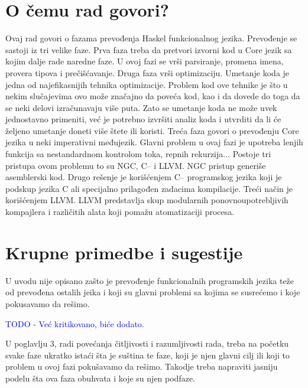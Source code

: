 \documentclass[a4paper]{report}
\newcommand{\odgovor}[1]{\textcolor{blue}{#1}}
\begin{document}
\section{O čemu rad govori?}
Ovaj rad govori o fazama prevođenja Haskel funkcionalnog jezika. Prevođenje se sastoji iz tri velike faze.
Prva faza treba da pretvori izvorni kod u Core jezik sa kojim dalje rade naredne faze. U ovoj fazi se vrši parsiranje, promena imena, provera tipova i prečišćavanje.
Druga faza vrši optimizaciju. Umetanje koda je jedna od najefikasnijih tehnika optimizacije. Problem kod ove tehnike je što u nekim slučajevima ovo može značajno da poveća kod, kao i da dovede do toga da se neki delovi izračunavaju više puta. Zato se umetanje koda ne može uvek jednostavno primeniti, već je potrebno izvršiti analiz koda i utvrditi da li će željeno umetanje doneti više štete ili koristi.
Treća faza govori o prevođenju Core jezika u neki imperativni međujezik. Glavni problem u ovaj fazi je upotreba lenjih funkcija sa nestandardnom kontrolom toka, repnih rekurzija... Postoje tri pristupa ovom problemu to su NGC, C-- i LLVM. NGC pristup generiše asemblerski kod. Drugo rešenje je korišćenjem C-- programskog jezika koji je podskup jezika C ali specijalno prilagođen zadacima kompilacije. Treći način je korišćenjem LLVM. LLVM predstavlja skup modularnih ponovnoupotrebljivih kompajlera i različitih alata koji pomažu atomatizaciji procesa.

\section{Krupne primedbe i sugestije}

U uvodu nije opisano zašto je prevođenje funkcionalnih programskih jezika teže od prevođena ostalih jeika i koji su glavni problemi sa kojima se susrećemo i koje pokusavamo da rešimo.

\odgovor{TODO - Već kritikovano, biće dodato.}

U poglavlju 3, radi povećanja čitljivosti i razumljivosti rada, treba na početku svake faze ukratko istaći šta je suština te faze, koji je njen glavni cilj ili koji to problem u ovoj fazi pokušavamo da rešimo. Takodje treba napraviti jasniju podelu šta ova faza obuhvata i koje su njen podfaze.
\end{document}
